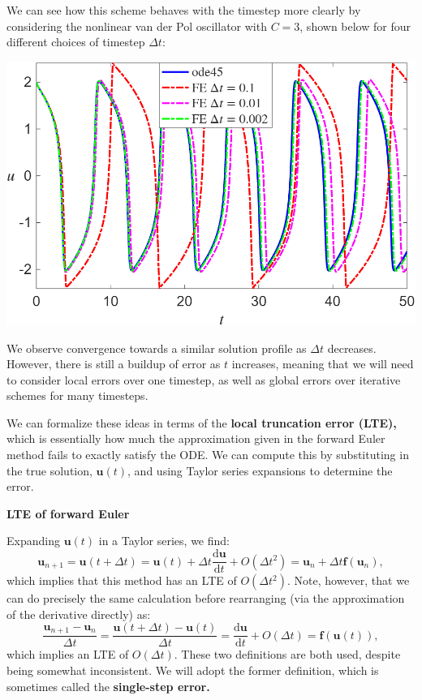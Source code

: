 \documentclass[
  letterpaper,
  DIV=11,
  numbers=noendperiod]{scrreprt}
\newenvironment{fbxSimple}[3]{\begin{tcolorbox}[enhanced, breakable,%
attach boxed title to top*={xshift=1.4pt},
boxed title style={boxrule=0.0mm, fuzzy shadow={1pt}{-1pt}{0mm}{0.1mm}{gray}, arc=.3em, rounded corners=east, sharp corners=west}, colframe=#1-color2, colbacktitle=#1-color1, colback = white, coltitle=black,  titlerule=0mm, toprule=0pt, bottomrule=.7pt, leftrule=.3em, rightrule=.7pt, outer arc=.3em,  	left=.5em, right=.5em, bottomtitle=1mm, toptitle=1mm,title=\textbf{#2}\hspace{0.5em}{#3}]}
{\end{tcolorbox}}
\begin{document}
We can see how this scheme behaves with the timestep more clearly by
considering the nonlinear van der Pol oscillator with \(C=3\), shown
below for four different choices of timestep \(\Delta t\):

\begin{center}
\includegraphics[width=0.7\linewidth,height=\textheight,keepaspectratio]{im/C3_FE_vanderPol.png}
\end{center}

We observe convergence towards a similar solution profile as
\(\Delta t\) decreases. However, there is still a buildup of error as
\(t\) increases, meaning that we will need to consider local errors over
one timestep, as well as global errors over iterative schemes for many
timesteps.

We can formalize these ideas in terms of the \textbf{local truncation
error (LTE),} which is essentially how much the approximation given in
the forward Euler method fails to exactly satisfy the ODE. We can
compute this by substituting in the true solution, \(\mathbf{u}(t)\),
and using Taylor series expansions to determine the error.

\label{eg-5.2}
\begin{fbxSimple}{eg}{Example 5.2}{}
\label{eg-5.2}
\textbf{LTE of forward Euler}

Expanding \(\mathbf{u}(t)\) in a Taylor series, we find: \[
\mathbf{u}_{n+1} = \mathbf{u}(t+\Delta t) = \mathbf{u}(t) + \Delta t \frac{\mathrm{d}\mathbf{u}}{\mathrm{d}t} + O(\Delta t^2) = \mathbf{u}_n + \Delta t \mathbf{f}(\mathbf{u}_n),
\] which implies that this method has an LTE of \(O(\Delta t^2)\). Note,
however, that we can do precisely the same calculation before
rearranging (via the approximation of the derivative directly) as: \[
\frac{\mathbf{u}_{n+1} - \mathbf{u}_n}{\Delta t} = \frac{\mathbf{u}(t+\Delta t) - \mathbf{u}(t)}{\Delta t} = \frac{\mathrm{d}\mathbf{u}}{\mathrm{d}t} + O(\Delta t) = \mathbf{f}(\mathbf{u}(t)),
\] which implies an LTE of \(O(\Delta t)\). These two definitions are
both used, despite being somewhat inconsistent. We will adopt the former
definition, which is sometimes called the \textbf{single-step error.}

\end{fbxSimple}
\end{document}
